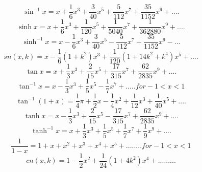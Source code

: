 \begin{equation}
\sin^{-1} x = x + \frac{1}{6} x^3 + \frac{3}{40} x^5 + \frac{5}{112} x^7 + \frac{35}{1152} x^9 + ....
\end{equation}
\begin{equation}
\sinh x = x + \frac{1}{6} x^3 + \frac{1}{120} x^5 + \frac{1}{5040} x^7 + \frac{1}{362880} x^9 + ....
\end{equation}
\begin{equation}
\sinh^{-1} x = x - \frac{1}{6} x^3 + \frac{3}{40} x^5 - \frac{5}{112} x^7 + \frac{35}{1152} x^9 -  ...
\end{equation}
\begin{equation}
sn(x,k) = x - \frac{1}{6}(1+k^2) x^3 + \frac{1}{120} (1 + 14k^2 + k^4) x^5 + .... 
\end{equation}
\begin{equation}
\tan x = x + \frac{1}{3} x^3 + \frac{2}{15} x^5 + \frac{17}{315} x^7 + \frac{62}{2835} x^9 + ....
\end{equation}
\begin{equation}
\tan^{-1} x= x - \frac{1}{3} x^3 + \frac{1}{5} x^5 - \frac{1}{7} x^7 + ..... for -1 < x < 1 
\end{equation}
\begin{equation}
\tan^{-1}(1+x) = \frac{1}{4} \pi + \frac{1}{2} x - \frac{1}{4} x^2 + \frac{1}{12} x ^3 + \frac{1}{40} x^5 + ....
\end{equation}
\begin{equation}
\tanh x = x - \frac{1}{3} x^3 + \frac{2}{15} x^5 - \frac{17}{315} x^7 + \frac{62}{2835} x^9 + ....
\end{equation}
\begin{equation}
\tanh^{-1} x = x + \frac{1}{3} x^3 + \frac{1}{5} x^5 + \frac{1}{7} x^7 + \frac{1}{9} x^{9} + ....
\end{equation}
\begin{equation}
\frac{1}{1-x}=1+x+x^{2}+x^{3}+x^{4}+x^{5}+........for -1<x<1 
\end{equation}
\begin{equation}
cn(x,k)=1-\frac{1}{2}x^{2}+\frac{1}{24}(1+4k^{2})x^{4}+.........
\end{equation}


